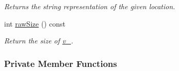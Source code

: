 \begin{DoxyCompactItemize}
\begin{DoxyCompactList}\small\item\em Returns the string representation of the given location. \end{DoxyCompactList}\item 
int \hyperlink{structslb_1_1ext_1_1explicit__space_1_1Grid_ae1dfa66a8c9f25eb20fa2baf8552876a}{raw\+Size} () const 
\begin{DoxyCompactList}\small\item\em Return the size of \hyperlink{structslb_1_1ext_1_1explicit__space_1_1Grid_aecb404c6bc75e985ee31a4fef89433d2}{v\+\_\+}. \end{DoxyCompactList}\end{DoxyCompactItemize}
\subsubsection*{Private Member Functions}
